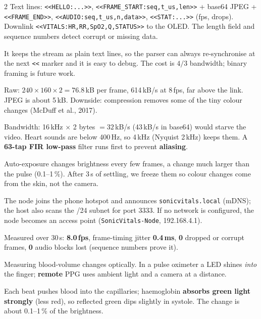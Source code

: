 \begin{multicols}{2}
{Text lines: \texttt{<<HELLO:...>>}, \texttt{<<FRAME\_START:seq,t\_us,len>>} + base64 JPEG + \texttt{<<FRAME\_END>>},
\texttt{<<AUDIO:seq,t\_us,n,data>>}, \texttt{<<STAT:...>>} (fps, drops). Downlink \texttt{<<VITALS:HR,RR,SpO2,Q,STATUS>>} to the
OLED. The length field and sequence numbers detect corrupt or missing data.}

{It keeps the stream as plain text lines, so the parser can always re-synchronise at the next \texttt{<<} marker and it is easy to
debug. The cost is $4/3$ bandwidth; binary framing is future work.}

{Raw: $240\times160\times2 = 76.8$\,kB per frame, 614\,kB/s at 8\,fps, far above the link. JPEG is about 5\,kB.
Downside: compression removes some of the tiny colour changes (McDuff et al., 2017).}

{Bandwidth: 16\,kHz $\times$ 2 bytes $=32$\,kB/s (43\,kB/s in base64) would starve the video. Heart sounds are below 400\,Hz, so
4\,kHz (Nyquist 2\,kHz) keeps them. A \textbf{63-tap FIR low-pass} filter runs first to prevent \textbf{aliasing}.}

{Auto-exposure changes brightness every few frames, a change much larger than the pulse (0.1--1\,\%). After 3\,s of settling,
we freeze them so colour changes come from the skin, not the camera.}

{The node joins the phone hotspot and announces \texttt{sonicvitals.local} (mDNS); the host also scans the /24 subnet for port
3333. If no network is configured, the node becomes an access point (\texttt{SonicVitals-Node}, 192.168.4.1).}

{Measured over 30\,s: \textbf{8.0\,fps}, frame-timing jitter \textbf{0.4\,ms}, \textbf{0} dropped or corrupt frames, \textbf{0} audio
blocks lost (sequence numbers prove it).}



{Measuring blood-volume changes optically. In a pulse oximeter a LED shines \emph{into} the finger; \textbf{remote} PPG uses
ambient light and a camera at a distance.}

{Each beat pushes blood into the capillaries; haemoglobin \textbf{absorbs green light strongly} (less red), so reflected green
dips slightly in systole. The change is about 0.1--1\,\% of the brightness.}


\end{multicols}
